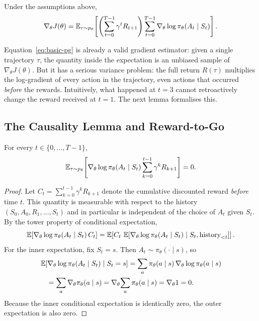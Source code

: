 \begin{theorem}
\label{thm:basic-pg}
Under the assumptions above,
\begin{equation}
\label{eq:basic-pg}
\nabla_\theta J(\theta)
= \operatorname{\mathbb{E}}_{\tau \sim p_\theta}\!\left[
  \left(\sum_{t=0}^{T-1} \gamma^t R_{t+1}\right)
  \sum_{t=0}^{T-1} \nabla_\theta \log \pi_\theta(A_t \mid S_t)
\right].
\end{equation}
\end{theorem}

Equation~\eqref{eq:basic-pg} is already a valid gradient estimator: given a single trajectory $\tau$, the quantity inside the expectation is an unbiased sample of $\nabla_\theta J(\theta)$.  But it has a serious variance problem: the full return $R(\tau)$ multiplies the log-gradient of every action in the trajectory, even actions that occurred \emph{before} the rewards.  Intuitively, what happened at $t=3$ cannot retroactively change the reward received at $t=1$.  The next lemma formalises this.

\subsection{The Causality Lemma and Reward-to-Go}

\begin{lemma}[Causality]
\label{lem:causality}
For every $t \in \{0, \ldots, T-1\}$,
\begin{equation}
\label{eq:causality}
\operatorname{\mathbb{E}}_{\tau \sim p_\theta}\!\left[\nabla_\theta \log \pi_\theta(A_t \mid S_t)\sum_{k=0}^{t-1} \gamma^k R_{k+1}\right] = 0.
\end{equation}
\end{lemma}

\begin{proof}
Let $C_t = \sum_{k=0}^{t-1} \gamma^k R_{k+1}$ denote the cumulative discounted reward \emph{before} time $t$.  This quantity is measurable with respect to the history $(S_0, A_0, R_1, \ldots, S_t)$ and in particular is independent of the choice of $A_t$ given $S_t$.  By the tower property of conditional expectation,
\[
\operatorname{\mathbb{E}}\!\left[\nabla_\theta \log \pi_\theta(A_t \mid S_t)\, C_t\right]
= \operatorname{\mathbb{E}}\!\left[C_t\, \operatorname{\mathbb{E}}\!\left[\nabla_\theta \log \pi_\theta(A_t \mid S_t) \mid S_t, \text{history}_{<t}\right]\right].
\]
For the inner expectation, fix $S_t = s$.  Then $A_t \sim \pi_\theta(\cdot \mid s)$, so
\begin{align*}
&\operatorname{\mathbb{E}}\!\left[\nabla_\theta \log \pi_\theta(A_t \mid S_t) \mid S_t = s\right]
= \sum_a \pi_\theta(a \mid s)\, \nabla_\theta \log \pi_\theta(a \mid s)\\
&\quad= \sum_a \nabla_\theta \pi_\theta(a \mid s)
= \nabla_\theta \!\sum_a \pi_\theta(a \mid s)
= \nabla_\theta 1 = 0.
\end{align*}
Because the inner conditional expectation is identically zero, the outer expectation is also zero.
\end{proof}

